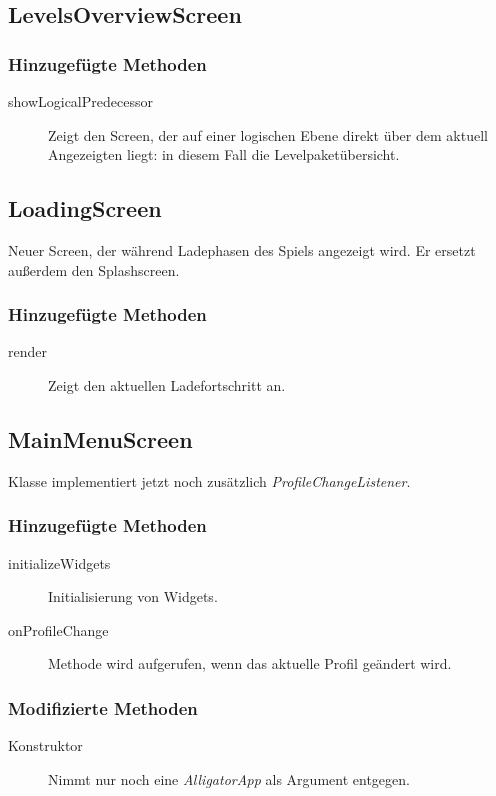 \subsection{LevelsOverviewScreen}
\subsubsection{Hinzugefügte Methoden}
\begin{description}
\item[showLogicalPredecessor]
Zeigt den Screen, der auf einer logischen Ebene direkt über dem aktuell Angezeigten liegt: in diesem Fall die Levelpaketübersicht.

\end{description}


\subsection{LoadingScreen}
Neuer Screen, der während Ladephasen des Spiels angezeigt wird. Er ersetzt außerdem den Splashscreen.

\subsubsection{Hinzugefügte Methoden}
\begin{description}
\item[render]
Zeigt den aktuellen Ladefortschritt an.


\end{description}



\subsection{MainMenuScreen}
Klasse implementiert jetzt noch zusätzlich \emph{ProfileChangeListener}.

\subsubsection{Hinzugefügte Methoden}
\begin{description}
\item[initializeWidgets]
Initialisierung von Widgets.
\item[onProfileChange]
Methode wird aufgerufen, wenn das aktuelle Profil geändert wird.

\end{description}

\subsubsection{Modifizierte Methoden}
\begin{description}
\item[Konstruktor]
Nimmt nur noch eine \emph{AlligatorApp} als Argument entgegen.

\end{description}


